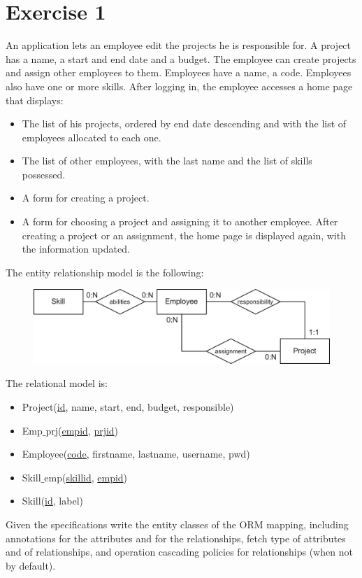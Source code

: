 \section{Exercise 1}

An application lets an employee edit the projects he is responsible for. 
A project has a name, a start and end date and a budget. 
The employee can create projects and assign other employees to them. 
Employees have a name, a code. Employees also have one or more skills. 
After logging in, the employee accesses a home page that displays:
\begin{itemize}
    \item The list of his projects, ordered by end date descending and with the list of employees allocated to each one. 
    \item The list of other employees, with the last name and the list of skills possessed. 
    \item A form for creating a project. 
    \item A form for choosing a project and assigning it to another employee. After creating a project or an assignment, the home page is displayed again, with the information updated. 
\end{itemize}
The entity relationship model is the following:
\begin{figure}[H]
    \centering
    \includegraphics[width=1.0\linewidth]{images/e-r.png}
\end{figure}
The relational model is: 
\begin{itemize}
    \item Project(\underline{id}, name, start, end, budget, responsible)
    \item Emp$\_$prj(\underline{empid}, \underline{prjid})
    \item Employee(\underline{code}, firstname, lastname, username, pwd)
    \item Skill$\_$emp(\underline{skillid}, \underline{empid})
    \item Skill(\underline{id}, label)
\end{itemize}
Given the specifications write the entity classes of the ORM mapping, including annotations for the attributes and for the relationships, fetch type of attributes and of relationships, and operation cascading policies for relationships (when not by default). 

